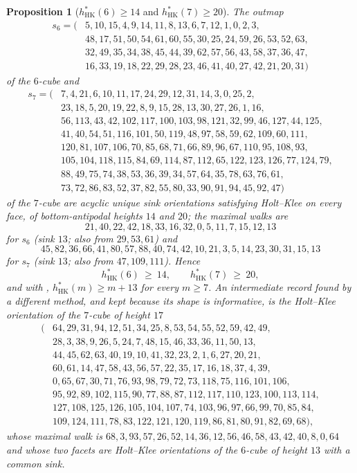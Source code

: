 \documentclass[11pt]{article}
\theoremstyle{plain}
\newtheorem{proposition}[theorem]{Proposition}
\theoremstyle{definition}
\begin{document}
\begin{proposition}[$h^{\ast}_{\mathrm{HK}}(6)\ge14$ and $h^{\ast}_{\mathrm{HK}}(7)\ge20$]\label{prop:hk-records}
The outmap
\[
\begin{aligned}
 s_6=(&5,10,15,4,9,14,11,8,13,6,7,12,1,0,2,3,\\
      &48,17,51,50,54,61,60,55,30,25,24,59,26,53,52,63,\\
      &32,49,35,34,38,45,44,39,62,57,56,43,58,37,36,47,\\
      &16,33,19,18,22,29,28,23,46,41,40,27,42,21,20,31)
\end{aligned}
\]
of the $6$-cube and
\[
\begin{aligned}
 s_7=(&7,4,21,6,10,11,17,24,29,12,31,14,3,0,25,2,\\
      &23,18,5,20,19,22,8,9,15,28,13,30,27,26,1,16,\\
      &56,113,43,42,102,117,100,103,98,121,32,99,46,127,44,125,\\
      &41,40,54,51,116,101,50,119,48,97,58,59,62,109,60,111,\\
      &120,81,107,106,70,85,68,71,66,89,96,67,110,95,108,93,\\
      &105,104,118,115,84,69,114,87,112,65,122,123,126,77,124,79,\\
      &88,49,75,74,38,53,36,39,34,57,64,35,78,63,76,61,\\
      &73,72,86,83,52,37,82,55,80,33,90,91,94,45,92,47)
\end{aligned}
\]
of the $7$-cube are acyclic unique sink orientations satisfying Holt--Klee
on every face, of bottom-antipodal heights $14$ and $20$; the maximal
walks are
\[
 21,40,22,42,18,33,16,32,0,5,11,7,15,12,13
\]
for $s_6$ (sink $13$; also from $29,53,61$) and
\[
 45,82,36,66,41,80,57,88,40,74,42,10,21,3,5,14,23,30,31,15,13
\]
for $s_7$ (sink $13$; also from $47,109,111$). Hence
\[
  h^{\ast}_{\mathrm{HK}}(6)\ \ge\ 14,\qquad
  h^{\ast}_{\mathrm{HK}}(7)\ \ge\ 20,
\]
and with ,
$h^{\ast}_{\mathrm{HK}}(m)\ge m+13$ for every $m\ge7$. An intermediate
record found by a different method, and kept because its shape is
informative, is the Holt--Klee orientation of the
$7$-cube of height $17$
\[
\begin{aligned}
 (&64,29,31,94,12,51,34,25,8,53,54,55,52,59,42,49,\\
  &28,3,38,9,26,5,24,7,48,15,46,33,36,11,50,13,\\
  &44,45,62,63,40,19,10,41,32,23,2,1,6,27,20,21,\\
  &60,61,14,47,58,43,56,57,22,35,17,16,18,37,4,39,\\
  &0,65,67,30,71,76,93,98,79,72,73,118,75,116,101,106,\\
  &95,92,89,102,115,90,77,88,87,112,117,110,123,100,113,114,\\
  &127,108,125,126,105,104,107,74,103,96,97,66,99,70,85,84,\\
  &109,124,111,78,83,122,121,120,119,86,81,80,91,82,69,68),
\end{aligned}
\]
whose maximal walk is
$68,3,93,57,26,52,14,36,12,56,46,58,43,42,40,8,0,64$ and whose two facets
are Holt--Klee orientations of the $6$-cube of height $13$ with a common
sink.
\end{proposition}
\end{document}
